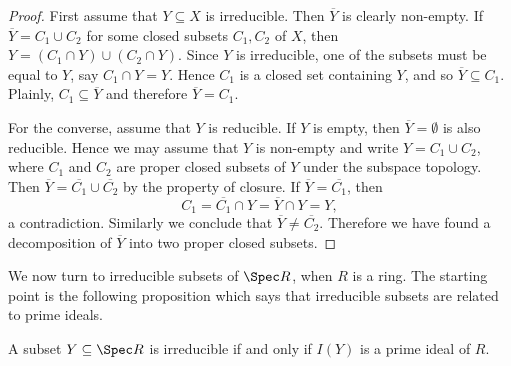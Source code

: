 \begin{proof}
	First assume that $Y \subseteq X$ is irreducible. Then $\overline{Y}$ is clearly non-empty. If $\overline{Y} = C_1 \cup C_2$ for some closed subsets $C_1, C_2$ of $X$, then $Y = (C_1 \cap Y) \cup (C_2 \cap Y)$. Since $Y$ is irreducible, one of the subsets must be equal to $Y$, say $C_1 \cap Y = Y$. Hence $C_1$ is a closed set containing $Y$, and so $\overline{Y} \subseteq C_1$. Plainly, $C_1 \subseteq \overline{Y}$ and therefore $\overline{Y} = C_1$.
	
	For the converse, assume that $Y$ is reducible. If $Y$ is empty, then $\overline{Y} = \emptyset$ is also reducible. Hence we may assume that $Y$ is non-empty and write $Y = C_1 \cup C_2$, where $C_1$ and $C_2$ are proper closed subsets of $Y$ under the subspace topology. Then $\overline{Y} = \overline{C_1} \cup \overline{C_2}$ by the property of closure. If $\overline{Y} = \overline{C_1}$, then 
	\begin{equation*}
		C_1 = \overline{C_1} \cap Y = \overline{Y} \cap Y = Y,
	\end{equation*} 
	a contradiction. Similarly we conclude that $\overline{Y} \neq \overline{C_2}$. Therefore we have found a decomposition of $\overline{Y}$ into two proper closed subsets.
\end{proof}

We now turn to irreducible subsets of $\Spec R$, when $R$ is a ring. The starting point is the following proposition which says that irreducible subsets are related to prime ideals.

\begin{proposition}\label{chap2:irreducible-iff-prime}
	A subset $Y \subseteq \Spec R$ is irreducible if and only if $I(Y)$ is a prime ideal of $R$.
\end{proposition}

